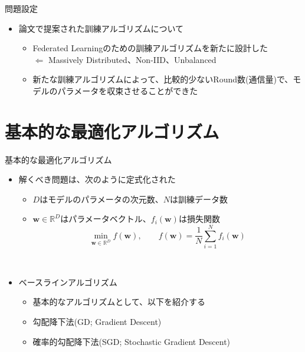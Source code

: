 \documentclass[dvipdfmx,notheorems,t]{beamer}
\begin{document}
\begin{frame}{問題設定}

\begin{itemize}
	\item 論文で提案された訓練アルゴリズムについて
	\begin{itemize}
		\item Federated Learningのための訓練アルゴリズムを新たに設計した \\
		$\Leftarrow$ \alert{Massively Distributed}、\alert{Non-IID}、\alert{Unbalanced}
		\newline
		
		\item 新たな訓練アルゴリズムによって、比較的少ないRound数(通信量)で、モデルのパラメータを収束させることができた
	\end{itemize}
\end{itemize}

\end{frame}

\section{基本的な最適化アルゴリズム}

\begin{frame}{基本的な最適化アルゴリズム}

\begin{itemize}
	\item 解くべき問題は、次のように定式化された
	\begin{itemize}
		\item $D$はモデルのパラメータの次元数、$N$は訓練データ数
		\item $\bm{w} \in \mathbb{R}^D$はパラメータベクトル、$f_i(\bm{w})$は損失関数
		\begin{equation}
			\min_{\bm{w} \in \mathbb{R}^D} f(\bm{w}), \qquad f(\bm{w}) = \frac{1}{N} \sum_{i = 1}^N f_i(\bm{w})
		\end{equation}
	\end{itemize} \
	
	\item ベースラインアルゴリズム
	\begin{itemize}
		\item 基本的なアルゴリズムとして、以下を紹介する
		\newline
		\item \alert{勾配降下法}(GD; Gradient Descent)
		\item \alert{確率的勾配降下法}(SGD; Stochastic Gradient Descent)
	\end{itemize}
\end{itemize}

\end{frame}
\end{document}
